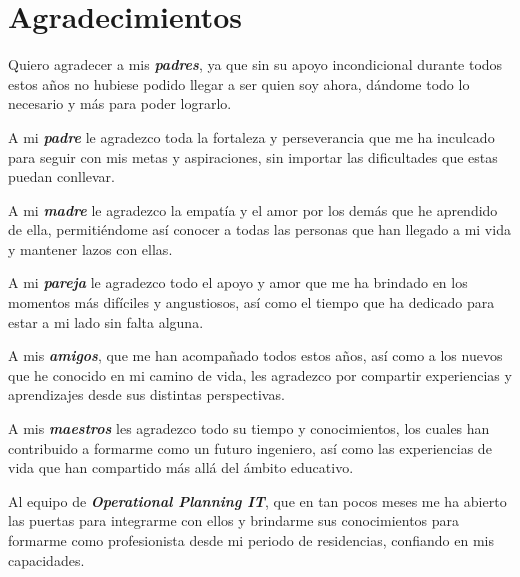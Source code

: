 \section*{Agradecimientos}

Quiero agradecer a mis \textbf{\textit{padres}}, ya que sin su apoyo incondicional durante todos estos años no hubiese podido llegar a ser quien soy ahora, dándome todo lo necesario y más para poder lograrlo.

A mi \textbf{\textit{padre}} le agradezco toda la fortaleza y perseverancia que me ha inculcado para seguir con mis metas y aspiraciones, sin importar las dificultades que estas puedan conllevar.

A mi \textbf{\textit{madre}} le agradezco la empatía y el amor por los demás que he aprendido de ella, permitiéndome así conocer a todas las personas que han llegado a mi vida y mantener lazos con ellas.

A mi \textbf{\textit{pareja}} le agradezco todo el apoyo y amor que me ha brindado en los momentos más difíciles y angustiosos, así como el tiempo que ha dedicado para estar a mi lado sin falta alguna.

A mis \textbf{\textit{amigos}}, que me han acompañado todos estos años, así como a los nuevos que he conocido en mi camino de vida, les agradezco por compartir experiencias y aprendizajes desde sus distintas perspectivas.

A mis \textbf{\textit{maestros}} les agradezco todo su tiempo y conocimientos, los cuales han contribuido a formarme como un futuro ingeniero, así como las experiencias de vida que han compartido más allá del ámbito educativo.

Al equipo de \textbf{\textit{Operational Planning IT}}, que en tan pocos meses me ha abierto las puertas para integrarme con ellos y brindarme sus conocimientos para formarme como profesionista desde mi periodo de residencias, confiando en mis capacidades.